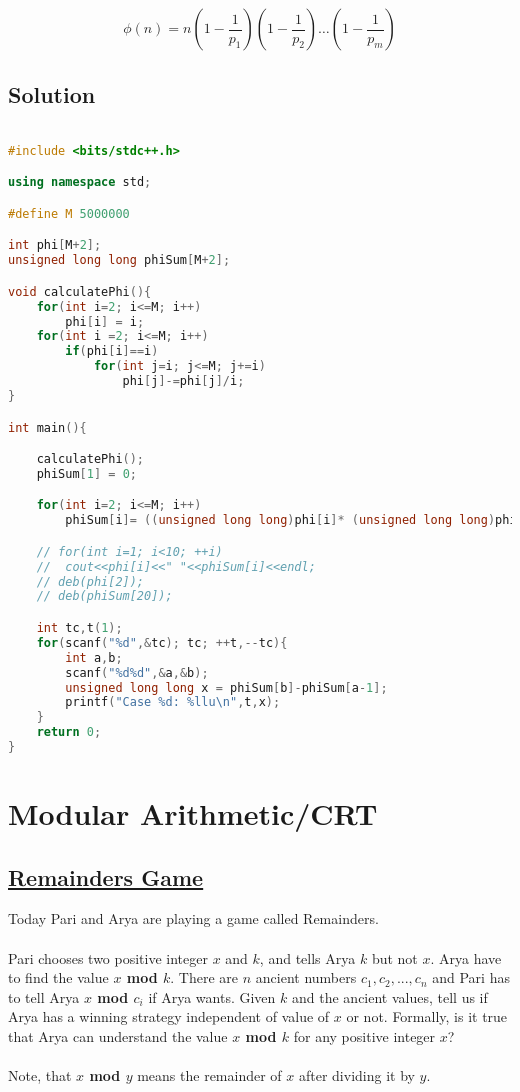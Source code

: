 \documentclass[10pt,a4paper]{article}
\begin{document}
$$\phi (n)=n \left(1 - \frac{1}{p_1}\right)\left(1 - \frac{1}{p_2}\right)…\left(1 - \frac{1}{p_m}\right)$$

\subsection*{Solution}

\begin{lstlisting}[language=C++, caption={Mathematically Hard}, label={1st:code}, mathescape=true, breaklines=true]

#include <bits/stdc++.h>

using namespace std;

#define M 5000000

int phi[M+2];
unsigned long long phiSum[M+2];

void calculatePhi(){
    for(int i=2; i<=M; i++)
        phi[i] = i;
    for(int i =2; i<=M; i++)
        if(phi[i]==i)
            for(int j=i; j<=M; j+=i)
                phi[j]-=phi[j]/i;
}

int main(){

    calculatePhi();
    phiSum[1] = 0;

    for(int i=2; i<=M; i++)
        phiSum[i]= ((unsigned long long)phi[i]* (unsigned long long)phi[i])+phiSum[i-1];

    // for(int i=1; i<10; ++i)
    //  cout<<phi[i]<<" "<<phiSum[i]<<endl;
    // deb(phi[2]);
    // deb(phiSum[20]);

    int tc,t(1);
    for(scanf("%d",&tc); tc; ++t,--tc){
        int a,b;
        scanf("%d%d",&a,&b);
        unsigned long long x = phiSum[b]-phiSum[a-1];
        printf("Case %d: %llu\n",t,x);
    }
    return 0;
}

\end{lstlisting}

\section{Modular Arithmetic/CRT}
\subsection*{\hyperlink{https://codeforces.com/problemset/problem/687/B}{\underline{Remainders Game}}}
Today Pari and Arya are playing a game called Remainders.
\\ \\
Pari chooses two positive integer $x$ and $k$, and tells Arya $k$ but not $x$. Arya have to find the value \textbf{$x$ mod $k$}. There are $n$ ancient numbers $c_1,c_2,...,c_n$ and Pari has to tell Arya \textbf{$x$ mod $c_i$} if Arya wants. Given $k$ and the ancient values, tell us if Arya has a winning strategy independent of value of $x$ or not. Formally, is it true that Arya can understand the value \textbf{$x$ mod $k$} for any positive integer $x$?
\\ \\
Note, that \textbf{$x$ mod $y$} means the remainder of $x$ after dividing it by $y$.
\end{document}
